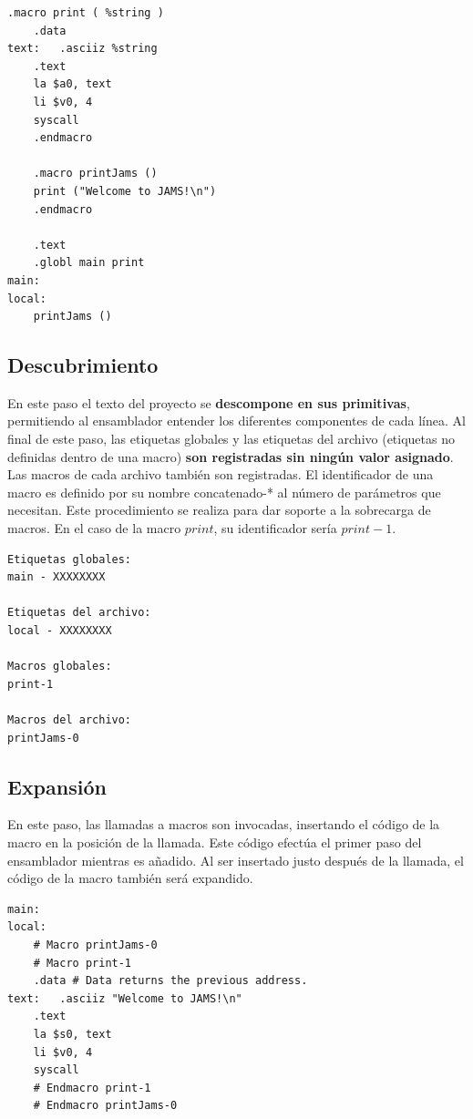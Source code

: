 \begin{lstlisting}[frame=single,label={lst:example.asm}]
    .macro print ( %string )
    .data
text:   .asciiz %string
    .text
    la $a0, text
    li $v0, 4
    syscall
    .endmacro

    .macro printJams ()
    print ("Welcome to JAMS!\n")
    .endmacro

    .text
    .globl main print
main:
local:
    printJams ()
\end{lstlisting}

\subsection{Descubrimiento}\label{subsec:descubrimiento}

En este paso el texto del proyecto se \textbf{descompone en sus primitivas},
permitiendo al ensamblador entender los diferentes componentes de cada línea.
Al final de este paso, las etiquetas globales y las etiquetas del archivo
(etiquetas no definidas dentro de una macro) \textbf{son registradas sin
ningún valor asignado}.
Las macros de cada archivo también son registradas.
El identificador de una macro es definido por su nombre concatenado-*
al número de parámetros que necesitan.
Este procedimiento se realiza para dar soporte a la sobrecarga de macros.
En el caso de la macro $print$, su identificador sería $print-1$.

\begin{lstlisting}[frame=single,label={lst:descubrimiento}]
Etiquetas globales:
main - XXXXXXXX

Etiquetas del archivo:
local - XXXXXXXX

Macros globales:
print-1

Macros del archivo:
printJams-0
\end{lstlisting}

\subsection{Expansión}\label{subsec:expansion}

En este paso, las llamadas a macros son invocadas,
insertando el código de la macro en la posición de la llamada.
Este código efectúa el primer paso del ensamblador mientras es añadido.
Al ser insertado justo después de la llamada, el código de la macro
también será expandido.

\begin{lstlisting}[frame=single,label={lst:expansion}]
main:
local:
    # Macro printJams-0
    # Macro print-1
    .data # Data returns the previous address.
text:   .asciiz "Welcome to JAMS!\n"
    .text
    la $s0, text
    li $v0, 4
    syscall
    # Endmacro print-1
    # Endmacro printJams-0
\end{lstlisting}

